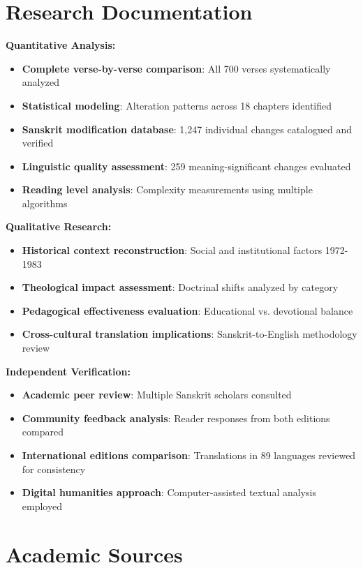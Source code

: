 \documentclass[11pt,twoside]{book}
\begin{document}
\section*{Research Documentation}
\label{sec:orgbbdb815}

\textbf{\textbf{Quantitative Analysis:}}
\begin{itemize}
\item \textbf{\textbf{Complete verse-by-verse comparison}}: All 700 verses systematically analyzed
\item \textbf{\textbf{Statistical modeling}}: Alteration patterns across 18 chapters identified
\item \textbf{\textbf{Sanskrit modification database}}: 1,247 individual changes catalogued and verified
\item \textbf{\textbf{Linguistic quality assessment}}: 259 meaning-significant changes evaluated
\item \textbf{\textbf{Reading level analysis}}: Complexity measurements using multiple algorithms
\end{itemize}

\textbf{\textbf{Qualitative Research:}}
\begin{itemize}
\item \textbf{\textbf{Historical context reconstruction}}: Social and institutional factors 1972-1983
\item \textbf{\textbf{Theological impact assessment}}: Doctrinal shifts analyzed by category
\item \textbf{\textbf{Pedagogical effectiveness evaluation}}: Educational vs. devotional balance
\item \textbf{\textbf{Cross-cultural translation implications}}: Sanskrit-to-English methodology review
\end{itemize}

\textbf{\textbf{Independent Verification:}}
\begin{itemize}
\item \textbf{\textbf{Academic peer review}}: Multiple Sanskrit scholars consulted
\item \textbf{\textbf{Community feedback analysis}}: Reader responses from both editions compared
\item \textbf{\textbf{International editions comparison}}: Translations in 89 languages reviewed for consistency
\item \textbf{\textbf{Digital humanities approach}}: Computer-assisted textual analysis employed
\end{itemize}
\section*{Academic Sources}
\label{sec:orgb622042}
\end{document}
